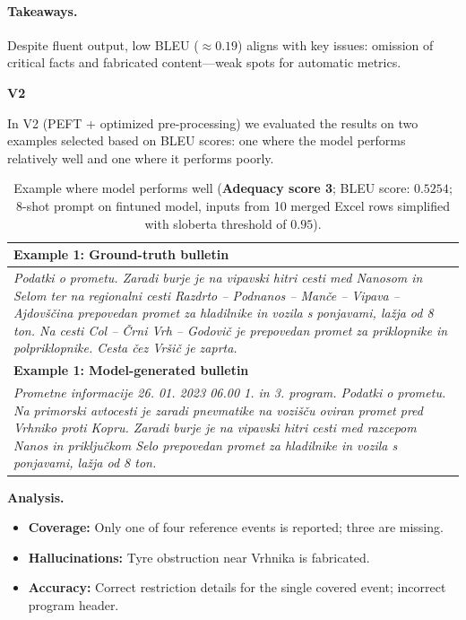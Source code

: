 \documentclass[fleqn,moreauthors,10pt]{ds_report}
\begin{document}
\paragraph{Takeaways.}
Despite fluent output, low BLEU ($\approx 0.19$) aligns with key issues: omission of critical facts and fabricated content—weak spots for automatic metrics.


\pagebreak
\vspace{1em}
\noindent \textbf{V2}
\vspace{0.5em}

In V2 (PEFT + optimized pre-processing) we evaluated the results on two examples selected based on BLEU scores: one where the model performs relatively well
and one where it performs poorly.

\begin{table}[!ht]
\centering
\footnotesize
\renewcommand{\arraystretch}{1.15}
\setlength{\tabcolsep}{4pt}
\begin{tabularx}{\linewidth}{@{}X@{}}
\toprule
\textbf{Example 1: Ground-truth bulletin} \\
\midrule
\textit{Podatki o prometu. Zaradi burje je na vipavski hitri cesti med Nanosom in Selom ter na regionalni cesti Razdrto – Podnanos – Manče – Vipava – Ajdovščina prepovedan promet za hladilnike in vozila s ponjavami, lažja od 8 ton. Na cesti Col – Črni Vrh – Godovič je prepovedan promet za priklopnike in polpriklopnike. Cesta čez Vršič je zaprta.} \\
\midrule
\textbf{Example 1: Model-generated bulletin} \\
\midrule
\textit{Prometne informacije 26. 01. 2023 06.00 1. in 3. program. Podatki o prometu. Na primorski avtocesti je zaradi pnevmatike na vozišču oviran promet pred Vrhniko proti Kopru. Zaradi burje je na vipavski hitri cesti med razcepom Nanos in priključkom Selo prepovedan promet za hladilnike in vozila s ponjavami, lažja od 8 ton.} \\
\bottomrule
\end{tabularx}
\caption{Example where model performs well (\textbf{Adequacy score 3}; BLEU score: $0.5254$; 8-shot prompt on fintuned model, inputs from 10 merged Excel rows simplified with sloberta threshold of $0.95$).}
\end{table}

\noindent \textbf{Analysis.}  
\begin{itemize}[noitemsep, topsep=0pt]
  \item \textbf{Coverage:} Only one of four reference events is reported; three are missing.
  \item \textbf{Hallucinations:} Tyre obstruction near Vrhnika is fabricated.
  \item \textbf{Accuracy:} Correct restriction details for the single covered event; incorrect program header.
\end{itemize}
\end{document}
